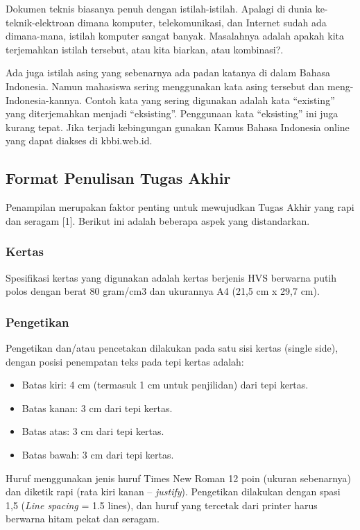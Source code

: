 \documentclass{final_project}
\begin{document}
Dokumen teknis biasanya penuh dengan istilah-istilah. Apalagi di dunia ke-teknik-elektroan dimana komputer, telekomunikasi, dan Internet sudah ada dimana-mana, istilah komputer sangat banyak. Masalahnya adalah apakah kita terjemahkan istilah tersebut, atau kita biarkan, atau kombinasi?.

Ada juga istilah asing yang sebenarnya ada padan katanya di dalam Bahasa Indonesia. Namun mahasiswa sering menggunakan kata asing tersebut dan meng-Indonesia-kannya. Contoh kata yang sering digunakan adalah kata “existing” yang diterjemahkan menjadi “eksisting”. Penggunaan kata “eksisting” ini juga kurang tepat. Jika terjadi kebingungan gunakan Kamus Bahasa Indonesia online yang dapat diakses di kbbi.web.id.

\subsection{Format Penulisan Tugas Akhir}

Penampilan merupakan faktor penting untuk mewujudkan Tugas Akhir yang rapi dan seragam [1]. Berikut ini adalah beberapa aspek yang distandarkan.

\subsubsection{Kertas}

Spesifikasi kertas yang digunakan adalah kertas berjenis HVS berwarna putih polos dengan berat 80 gram/cm3 dan ukurannya A4 (21,5 cm x 29,7 cm).

\subsubsection{Pengetikan}

Pengetikan dan/atau pencetakan dilakukan pada satu sisi kertas (single side), dengan posisi penempatan teks pada tepi kertas adalah: 
\begin{itemize}
    \item Batas kiri: 4 cm (termasuk 1 cm untuk penjilidan) dari tepi kertas. 
    \item Batas kanan: 3 cm dari tepi kertas.
    \item Batas atas: 3 cm dari tepi kertas.
    \item Batas bawah: 3 cm dari tepi kertas. 
\end{itemize}

Huruf menggunakan jenis huruf Times New Roman 12 poin (ukuran sebenarnya) dan diketik rapi (rata kiri kanan – \textit{justify}). Pengetikan dilakukan dengan spasi 1,5 (\textit{Line spacing} = 1.5 lines), dan huruf yang tercetak dari printer harus berwarna hitam pekat dan seragam.
\end{document}
